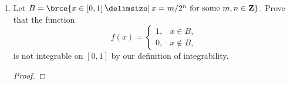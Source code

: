 \documentclass[a4paper]{article}
\begin{document}
\begin{enumerate}
  \begin{proof}
    Let \(P_1\) and \(P_2\) be partitions for \(s\) and \(t\) respectively.
    Let \(P = \brce{x_0, x_1, \dotsc, x_n}\) be the common refinement of
    \(P_1\) and \(P_2\).  Denote \(s(x) = s_k\) and \(t(x) = t_k\) for all
    \(x\) on every open interval \((x_{k-1}, x_k)\).  Then we have
    \begin{align*}
      \paren[\bigg]{\int_a^b s \cdot t}^2
        &= \brce*{\sum_{k=1}^n s_k t_k \paren{x_k - x_{k-1}}}^2 \\
        &= \brce*{\sum_{k=1}^n \paren[\big]{s_k \sqrt{x_k - x_{k-1}}} \paren[\big]{t_k \sqrt{x_k - x_{k-1}}}}^2 \\
        &\le \brce*{\sum_{k=1}^n s_k^2 \paren{x_k - x_{k-1}}} \brce*{\sum_{k=1}^n t_k^2 \paren{x_k - x_{k-1}}} \\
        &= \int_a^b s^2 \cdot \int_a^b t^2.
    \end{align*}
    The equality holds if and only if there exists a constant \(c\) such
    that
    \[
      s_k \sqrt{x_k - x_{k-1}} = c t_k \sqrt{x_k - x_{k-1}}
    \]
    for each \(k\).  Since \(x_k - x_{k-1} > 0\), we can cancel out the
    \(\sqrt{x_k - x_{k-1}}\) factor from both sides of the above equation
    and obtain \(s_k = c t_k\) for each \(k\).
  \end{proof}

\item[\bonus] Let
  \(B = \brce{x \in [0, 1] \mid x = m/2^n \text{ for some } m, n \in
    \mathbf{Z}}\).  Prove that the function
  \[
    f(x) =
    \begin{cases}
      1, & x \in B, \\
      0, & x \notin B,
    \end{cases}
  \]
  is not integrable on \([0, 1]\) by our definition of integrability.

  \begin{proof}
    
  \end{proof}
\end{enumerate}
\end{document}
